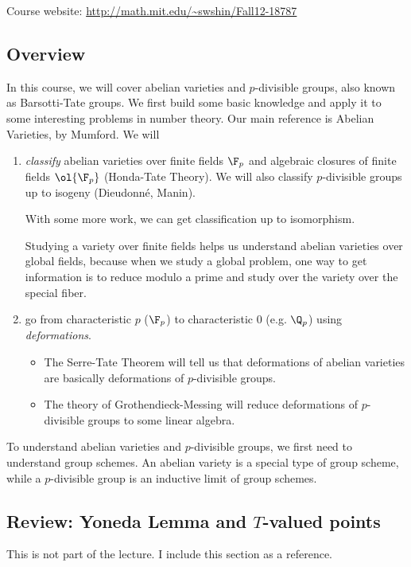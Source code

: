 
Course website: \url{http://math.mit.edu/\~swshin/Fall12-18787}

\subsection{Overview}

In this course, we will cover abelian varieties and $p$-divisible groups, also known as Barsotti-Tate groups. We first build some basic knowledge and apply it to some interesting problems in number theory. Our main reference is Abelian Varieties, by Mumford. We will
\begin{enumerate}
\item
{\it classify} abelian varieties over finite fields $\F_p$ and algebraic closures  of finite fields $\ol{\F_p}$ (Honda-Tate Theory). We will also classify $p$-divisible groups up to isogeny (Dieudonn\'e, Manin).

With some more work, we can get classification up to isomorphism.

Studying a variety over finite fields helps us understand abelian varieties over global fields, because when we study a global problem, one way to get information is to reduce modulo a prime and study over the variety over the special fiber.

\item
go from characteristic $p$ ($\F_p$) to characteristic 0 (e.g. $\Q_p$) using {\it deformations}.
\begin{itemize}
\item
The Serre-Tate Theorem will tell us that deformations of abelian varieties are basically deformations of $p$-divisible groups.
\item
The theory of Grothendieck-Messing will reduce deformations of $p$-divisible groups to some linear algebra.
\end{itemize}
\end{enumerate}
To understand abelian varieties and $p$-divisible groups, we first need to understand group schemes. An abelian variety is a special type of group scheme, while a $p$-divisible group is an inductive limit of group schemes.

\subsection{Review: Yoneda Lemma and $T$-valued points}
This is not part of the lecture. I include this section as a reference.
